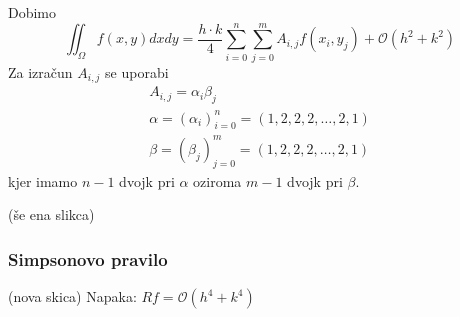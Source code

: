 \documentclass[a4paper,12pt]{article}
\theoremstyle{definition}
\theoremstyle{remark}
\begin{document}
Dobimo
\begin{equation*}
    \iint_{\Omega} f(x, y) dx dy = \frac{h \cdot k}{4} \sum_{i=0}^{n} \sum_{j=0}^{m} A_{i, j} f(x_i, y_j) + \mathcal{O}(h^2 + k^2)    
\end{equation*}
Za izračun $A_{i, j}$ se uporabi
\begin{gather*}
    A_{i, j} = \alpha_i \beta_j \\
    \alpha = (\alpha_i)_{i=0}^n = (1, 2, 2, 2, \dots, 2, 1) \\
    \beta = (\beta_j)_{j=0}^m = (1, 2, 2, 2, \dots, 2, 1)
\end{gather*}
kjer imamo $n-1$ dvojk pri $\alpha$ oziroma $m-1$ dvojk pri $\beta$.

(še ena slikca)

\subsubsection{Simpsonovo pravilo}
(nova skica)
Napaka: $Rf = \mathcal{O}(h^4 + k^4)$
\end{document}
